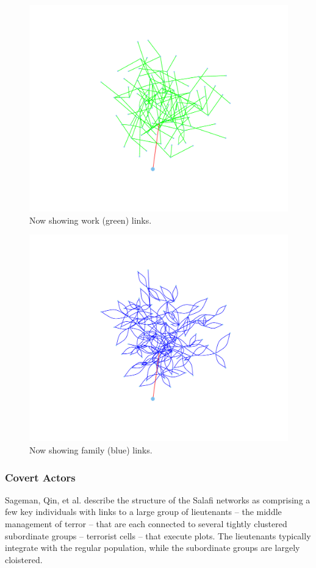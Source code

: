 \documentclass{article}
\newenvironment{rnwfig}[0]{\begin{figure}\begin{center}}{\end{center}\end{figure}}
\begin{document}
\begin{rnwfig}
\includegraphics{manuscript-workAlt}
\caption{Now showing work (green) links.}
\end{rnwfig}

\begin{rnwfig}
\includegraphics{manuscript-familyAlt}
\caption{Now showing family (blue) links.}
\end{rnwfig}

\subsubsection*{Covert Actors}
Sageman, Qin, et al. describe the structure of the Salafi networks as comprising a few key individuals with links to a large group of lieutenants -- the middle management of terror -- that are each connected to several tightly clustered subordinate groups -- terrorist cells -- that execute plots.  The lieutenants typically integrate with the regular population, while the subordinate groups are largely cloistered.
\end{document}
